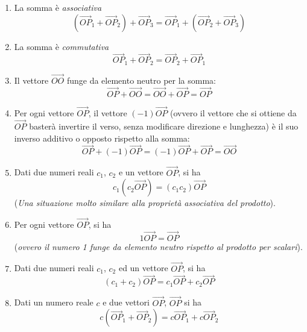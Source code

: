 \documentclass{book}
\theoremstyle{definition}
\theoremstyle{plain}
\begin{document}
\begin{enumerate}
\item La somma è \textit{associativa}
  \begin{equation}
    \label{eq:sommaassociativa}
    (\vec{OP}_1+\vec{OP}_2)+\vec{OP}_3=\vec{OP}_1+(\vec{OP}_2+\vec{OP}_3)
  \end{equation}
\item La somma è \textit{commutativa}
  \begin{equation}
    \label{eq:commutativa}
    \vec{OP}_1+\vec{OP}_2=\vec{OP}_2+\vec{OP}_1
  \end{equation}
\item Il vettore $\vec{OO}$ funge da elemento neutro per la somma:
  \begin{equation}
    \label{eq:sommaelementoneutro}
    \vec{OP}+\vec{OO}=\vec{OO}+\vec{OP}=\vec{OP}
  \end{equation}
\item Per ogni vettore $\vec{OP}$, il vettore $(-1)\vec{OP}$ (ovvero il vettore che si ottiene da $\vec{OP}$ basterà invertire il verso, senza modificare direzione e lunghezza) è il suo inverso additivo o opposto rispetto alla somma:
  \begin{equation}
    \label{eq:sommainversa}
    \vec{OP}+(-1)\vec{OP}=(-1)\vec{OP}+\vec{OP}=\vec{OO}
  \end{equation}
\item Dati due numeri reali $c_1$, $c_2$ e un vettore $\vec{OP}$, si ha
  \begin{equation}
    \label{eq:prodottoconduenumerireali}
    c_1(c_2\vec{OP})=(c_1c_2)\vec{OP}
  \end{equation}
  (\textit{Una situazione molto similare alla proprietà associativa del prodotto}).
\item Per ogni vettore $\vec{OP}$, si ha
  \begin{equation}
    \label{eq:perognivecOP}
    1\vec{OP}=\vec{OP}
  \end{equation}
  (\textit{ovvero il numero 1 funge da elemento neutro rispetto al prodotto per scalari}).
\item Dati due numeri reali $c_1$, $c_2$ ed un vettore $\vec{OP}$, si ha
  \begin{equation}
    \label{eq:numrealeVectOP}
    (c_1+c_2)\vec{OP}=c_1\vec{OP}+c_2\vec{OP}
  \end{equation}
\item Dati un numero reale $c$ e due vettori $\vec{OP}$, $\vec{OP}$ si ha
  \begin{equation}
    \label{eq:prodottoconduenumerirealiperunnumeroreale}
    c(\vec{OP}_1+\vec{OP}_2)=c\vec{OP}_1+c\vec{OP}_2
  \end{equation}
\end{enumerate}
\end{document}
